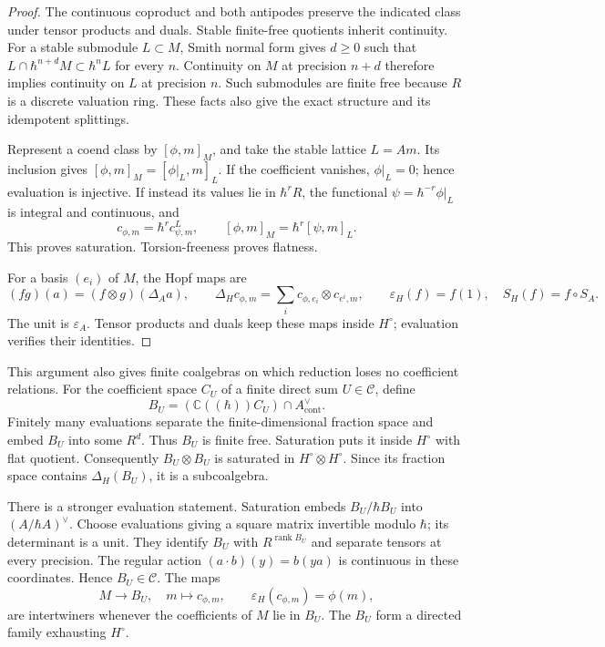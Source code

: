 \begin{proof}
The continuous coproduct and both antipodes preserve the indicated
class under tensor products and duals. Stable finite-free quotients
inherit continuity. For a stable submodule \(L\subset M\), Smith
normal form gives \(d\geq0\) such that
\(L\cap\hbar^{n+d}M\subset\hbar^nL\) for every \(n\).
Continuity on \(M\) at precision \(n+d\) therefore implies
continuity on \(L\) at precision \(n\). Such submodules are finite
free because \(R\) is a discrete valuation ring. These facts also
give the exact structure and its idempotent splittings.

Represent a coend class by \([\phi,m]_M\), and take the stable
lattice \(L=Am\). Its inclusion gives
\([\phi,m]_M=[\phi|_L,m]_L\). If the coefficient vanishes,
\(\phi|_L=0\); hence evaluation is injective.
If instead its values lie in \(\hbar^rR\), the functional
\(\psi=\hbar^{-r}\phi|_L\) is integral and continuous, and
\[
 c_{\phi,m}=\hbar^r c^L_{\psi,m},\qquad
 [\phi,m]_M=\hbar^r[\psi,m]_L.
\]
This proves saturation. Torsion-freeness proves flatness.

For a basis \((e_i)\) of \(M\), the Hopf maps are
\[
 (fg)(a)=(f\otimes g)(\Delta_Aa),\qquad
 \Delta_Hc_{\phi,m}=\sum_i c_{\phi,e_i}\otimes c_{e^i,m},
 \qquad \varepsilon_H(f)=f(1),\quad S_H(f)=f\circ S_A.
\]
The unit is \(\varepsilon_A\). Tensor products and duals keep these
maps inside \(H^\circ\); evaluation verifies their identities.
\end{proof}

This argument also gives finite coalgebras on which reduction loses
no coefficient relations. For the coefficient space \(C_U\) of a
finite direct sum \(U\in\mathcal C\), define
\[
 B_U=(\mathbb C((\hbar))C_U)\cap A^\vee_{\mathrm{cont}}.
\]
Finitely many evaluations separate the finite-dimensional fraction
space and embed \(B_U\) into some \(R^d\). Thus \(B_U\) is finite
free. Saturation puts it inside \(H^\circ\) with flat quotient.
Consequently \(B_U\otimes B_U\) is saturated in
\(H^\circ\otimes H^\circ\). Since its fraction space contains
\(\Delta_H(B_U)\), it is a subcoalgebra.

There is a stronger evaluation statement. Saturation embeds
\(B_U/\hbar B_U\) into \((A/\hbar A)^\vee\).
Choose evaluations giving a square matrix invertible modulo
\(\hbar\); its determinant is a unit. They identify \(B_U\)
with \(R^{\operatorname{rank}B_U}\) and separate tensors at every
precision. The regular action
\((a\cdot b)(y)=b(ya)\) is continuous in these coordinates.
Hence \(B_U\in\mathcal C\). The maps
\[
 M\longrightarrow B_U,\quad m\longmapsto c_{\phi,m},
 \qquad \varepsilon_H(c_{\phi,m})=\phi(m),
\]
are intertwiners whenever the coefficients of \(M\) lie in \(B_U\).
The \(B_U\) form a directed family exhausting \(H^\circ\).

